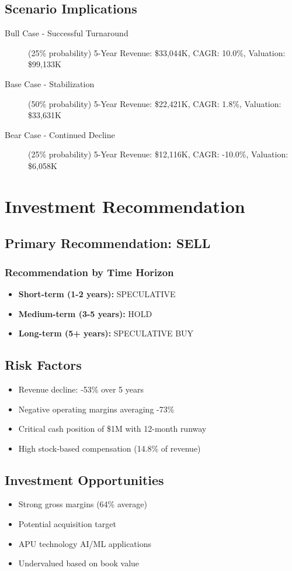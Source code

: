 \documentclass[11pt,a4paper]{article}
\begin{document}
\subsection{Scenario Implications}

\begin{description}
\item[Bull Case - Successful Turnaround] (25\% probability)
5-Year Revenue: \$33,044K, CAGR: 10.0\%, Valuation: \$99,133K

\item[Base Case - Stabilization] (50\% probability)
5-Year Revenue: \$22,421K, CAGR: 1.8\%, Valuation: \$33,631K

\item[Bear Case - Continued Decline] (25\% probability)
5-Year Revenue: \$12,116K, CAGR: -10.0\%, Valuation: \$6,058K

\end{description}


\newpage

\section{Investment Recommendation}

\subsection{Primary Recommendation: SELL}

\subsubsection{Recommendation by Time Horizon}

\begin{itemize}
\item \textbf{Short-term (1-2 years):} SPECULATIVE
\item \textbf{Medium-term (3-5 years):} HOLD
\item \textbf{Long-term (5+ years):} SPECULATIVE BUY
\end{itemize}

\subsection{Risk Factors}

\begin{itemize}
\item Revenue decline: -53\% over 5 years
\item Negative operating margins averaging -73\%
\item Critical cash position of \$1M with 12-month runway
\item High stock-based compensation (14.8\% of revenue)
\end{itemize}

\subsection{Investment Opportunities}

\begin{itemize}
\item Strong gross margins (64\% average)
\item Potential acquisition target
\item APU technology AI/ML applications
\item Undervalued based on book value
\end{itemize}
\end{document}
